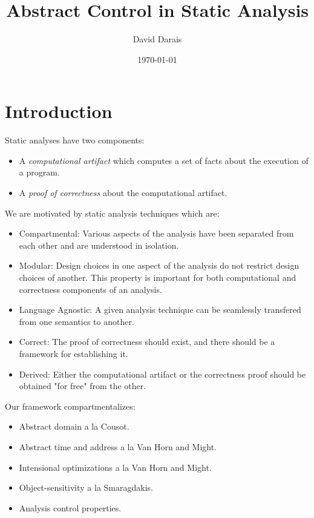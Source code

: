 \documentclass{article}
\title{Abstract Control in Static Analysis}
\author{David Darais}
\date{\today}
\begin{document}
\maketitle

\begin{abstract} %
\end{abstract} %

\tableofcontents

\section{Introduction}
\label{section:Introduction}

Static analyses have two components: 
%
\begin{itemize}
\item A \emph{computational artifact} which computes a set of facts about the execution of a program.
\item A \emph{proof of correctness} about the computational artifact.
\end{itemize}


We are motivated by static analysis techniques which are:
%
\begin{itemize}
\item Compartmental: Various aspects of the analysis have been separated from each other and are understood in isolation.
\item Modular: Design choices in one aspect of the analysis do not restrict design choices of another.  This property is important for both computational and correctness components of an analysis.
\item Language Agnostic: A given analysis technique can be seamlessly transfered from one semantics to another.
\item Correct: The proof of correctness should exist, and there should be a framework for establishing it.
\item Derived: Either the computational artifact or the correctness proof should be obtained "for free" from the other.
\end{itemize}

Our framework compartmentalizes:
%
\begin{itemize}
\item Abstract domain a la Cousot.
\item Abstract time and address a la Van Horn and Might.
\item Intensional optimizations a la Van Horn and Might. 
\item Object-sensitivity a la Smaragdakis.
\item Analysis control properties.
\end{itemize}
\end{document}
